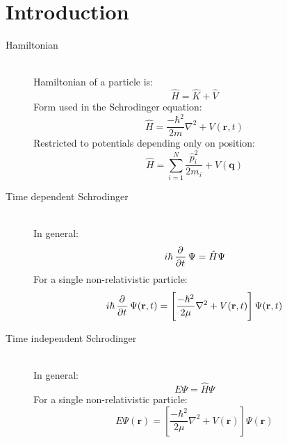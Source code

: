 \documentclass[12pt,letterpaper,oneside,final,titlepage]{article}               %
\numberwithin{equation}{section} %
\renewcommand{\vec}[1]{\mathbf{#1}}
\begin{document}
\section{Introduction}
\begin{description}

    \item[Hamiltonian] \hfill \\
    Hamiltonian of a particle is:
    \begin{equation}
    	\hat{H} = \hat{K} + \hat{V}
    \end{equation}
    Form used in the Schrodinger equation:
    \begin{equation}
    	\hat{H} = \frac{-\hbar^{2}}{2m}\nabla^{2} + V(\vec{r},t)
    \end{equation}
    Restricted to potentials depending only on position:
    \begin{equation}
    	\hat{H} = \sum_{i=1}^{N}\frac{\hat{p}_{i}^2}{2m_{i}} + V(\vec{q})
    \end{equation}

    \item[Time dependent Schrodinger] \hfill \\
    In general:
    \begin{equation}
    	i\hbar\dpd{}{t}\Psi = \hat{H}\Psi	
    \end{equation}
    For a single non-relativistic particle:
    \begin{equation}
    	i\hbar\dpd{}{t}\Psi(\vec{r},t) = \left[\frac{-\hbar^{2}}{2\mu}\nabla^{2} + V(\vec{r},t)\right]\Psi(\vec{r},t)
    \end{equation}

    \item[Time independent Schrodinger] \hfill \\
    In general:
    \begin{equation}
    	E\Psi = \hat{H}\Psi
    \end{equation}
    For a single non-relativistic particle:
    \begin{equation}
    	E\Psi(\vec{r}) = \left[\frac{-\hbar^{2}}{2\mu}\nabla^{2} + V(\vec{r})\right]\Psi(\vec{r})
    \end{equation}
\end{description} 
\end{document}
